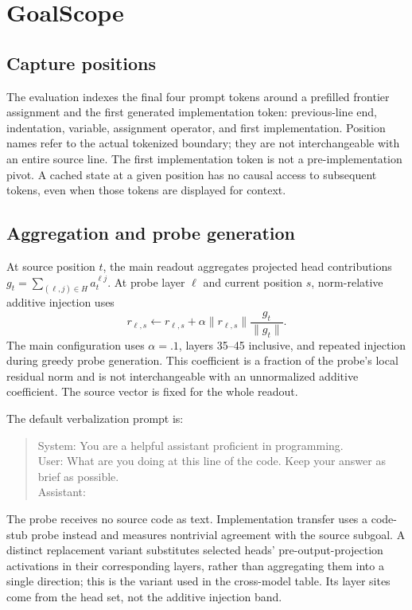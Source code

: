 \section{GoalScope}
\label{app:goalscope}
\subsection{Capture positions}
\label{app:pivots}
The evaluation indexes the final four prompt tokens around a prefilled frontier assignment and the first generated implementation token: previous-line end, indentation, variable, assignment operator, and first implementation. Position names refer to the actual tokenized boundary; they are not interchangeable with an entire source line. The first implementation token is not a pre-implementation pivot. A cached state at a given position has no causal access to subsequent tokens, even when those tokens are displayed for context.

\subsection{Aggregation and probe generation}
At source position $t$, the main readout aggregates projected head contributions $g_t=\sum_{(\ell,j)\in H}a_t^{\ell j}$. At probe layer $\ell$ and current position $s$, norm-relative additive injection uses
\begin{equation}
r_{\ell,s}\leftarrow r_{\ell,s}+\alpha\|r_{\ell,s}\|\frac{g_t}{\|g_t\|}.
\end{equation}
The main configuration uses $\alpha=.1$, layers 35--45 inclusive, and repeated injection during greedy probe generation. This coefficient is a fraction of the probe's local residual norm and is not interchangeable with an unnormalized additive coefficient. The source vector is fixed for the whole readout.

The default verbalization prompt is:
\begin{quote}\small
System: You are a helpful assistant proficient in programming.\\
User: What are you doing at this line of the code. Keep your answer as brief as possible.\\
Assistant:
\end{quote}
The probe receives no source code as text. Implementation transfer uses a code-stub probe instead and measures nontrivial agreement with the source subgoal. A distinct replacement variant substitutes selected heads' pre-output-projection activations in their corresponding layers, rather than aggregating them into a single direction; this is the variant used in the cross-model table. Its layer sites come from the head set, not the additive injection band.

